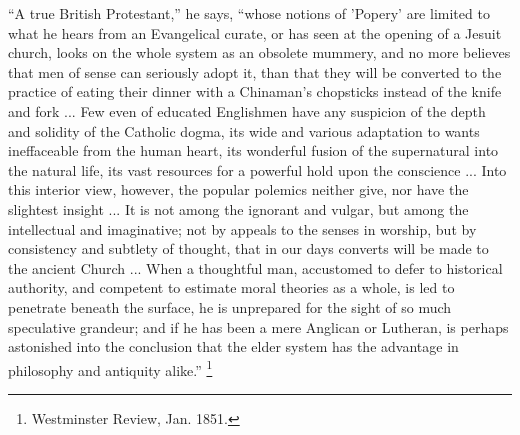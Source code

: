 ``A true British Protestant,'' he says,
``whose notions of 'Popery' are limited to what he
hears from an Evangelical curate, or has seen at the
opening of a Jesuit church, looks on the whole system as
an obsolete mummery, and no more believes that men of
sense can seriously adopt it, than that they will be
converted to the practice of eating their dinner with a
Chinaman's chopsticks instead of the knife and fork ...
Few even of educated Englishmen have any suspicion of the
depth and solidity of the Catholic dogma, its wide and
various adaptation to wants ineffaceable from the human
heart, its wonderful fusion of the supernatural into the
natural life, its vast resources for a powerful hold upon
the conscience ... Into this interior view, however, the
popular polemics neither give, nor have the slightest
insight ... It is not among the ignorant and vulgar, but
among the intellectual and imaginative; not by appeals to
the senses in worship, but by consistency and subtlety of
thought, that in our days converts will be made to the
ancient Church ... When a thoughtful man, accustomed to
defer to historical authority, and competent to estimate
moral theories as a whole, is led to penetrate beneath
the surface, he is unprepared for the sight of so much
speculative grandeur; and if he has been a mere Anglican
or Lutheran, is perhaps astonished into the conclusion
that the elder system has the advantage in philosophy and
antiquity alike.'' \footnote{Westminster Review, Jan. 1851.}

